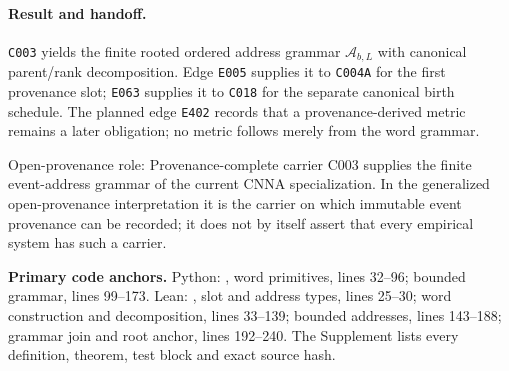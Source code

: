 \paragraph*{Result and handoff.}
\texttt{C003} yields the finite rooted ordered address grammar
$\mathcal A_{b,L}$ with canonical parent/rank decomposition.  Edge
\texttt{E005} supplies it to \texttt{C004A} for the first provenance slot;
\texttt{E063} supplies it to \texttt{C018} for the separate canonical birth
schedule.  The planned edge \texttt{E402} records that a provenance-derived
metric remains a later obligation; no metric follows merely from the word
grammar.

\begin{cnnaInfoBox}{Open-provenance role: Provenance-complete carrier}
C003 supplies the finite event-address grammar of the current CNNA specialization.  In the generalized open-provenance interpretation it is the carrier on which immutable event provenance can be recorded; it does not by itself assert that every empirical system has such a carrier.
\end{cnnaInfoBox}

\noindent\textbf{Primary code anchors.}
Python: ,
word primitives, lines 32--96; bounded grammar, lines 99--173.  Lean:
,
slot and address types, lines 25--30; word construction and decomposition,
lines 33--139; bounded addresses, lines 143--188; grammar join and root anchor,
lines 192--240.  The Supplement lists every definition, theorem, test block
and exact source hash.
